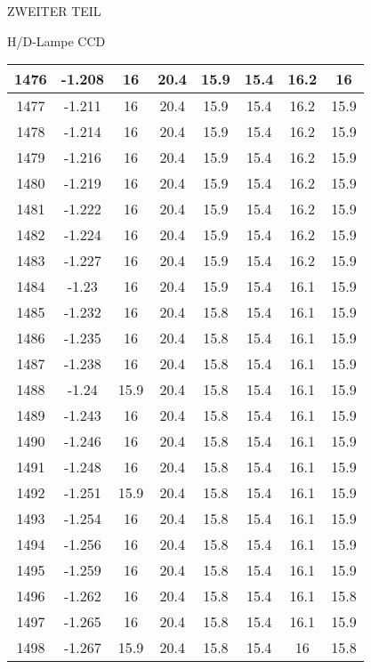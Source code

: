 \begin{appendix}
\begin{chapter}{ZWEITER TEIL}
\begin{section}{H/D-Lampe CCD}
\begin{scriptsize}
\begin{longtable}[htbp]{|c|c|c|c|c|c|c|c|}
            1476 & -1.208 & 16 & 20.4 & 15.9 & 15.4 & 16.2 & 16 \\ \hline
            1477 & -1.211 & 16 & 20.4 & 15.9 & 15.4 & 16.2 & 15.9 \\ \hline
            1478 & -1.214 & 16 & 20.4 & 15.9 & 15.4 & 16.2 & 15.9 \\ \hline
            1479 & -1.216 & 16 & 20.4 & 15.9 & 15.4 & 16.2 & 15.9 \\ \hline
            1480 & -1.219 & 16 & 20.4 & 15.9 & 15.4 & 16.2 & 15.9 \\ \hline
            1481 & -1.222 & 16 & 20.4 & 15.9 & 15.4 & 16.2 & 15.9 \\ \hline
            1482 & -1.224 & 16 & 20.4 & 15.9 & 15.4 & 16.2 & 15.9 \\ \hline
            1483 & -1.227 & 16 & 20.4 & 15.9 & 15.4 & 16.2 & 15.9 \\ \hline
            1484 & -1.23 & 16 & 20.4 & 15.9 & 15.4 & 16.1 & 15.9 \\ \hline
            1485 & -1.232 & 16 & 20.4 & 15.8 & 15.4 & 16.1 & 15.9 \\ \hline
            1486 & -1.235 & 16 & 20.4 & 15.8 & 15.4 & 16.1 & 15.9 \\ \hline
            1487 & -1.238 & 16 & 20.4 & 15.8 & 15.4 & 16.1 & 15.9 \\ \hline
            1488 & -1.24 & 15.9 & 20.4 & 15.8 & 15.4 & 16.1 & 15.9 \\ \hline
            1489 & -1.243 & 16 & 20.4 & 15.8 & 15.4 & 16.1 & 15.9 \\ \hline
            1490 & -1.246 & 16 & 20.4 & 15.8 & 15.4 & 16.1 & 15.9 \\ \hline
            1491 & -1.248 & 16 & 20.4 & 15.8 & 15.4 & 16.1 & 15.9 \\ \hline
            1492 & -1.251 & 15.9 & 20.4 & 15.8 & 15.4 & 16.1 & 15.9 \\ \hline
            1493 & -1.254 & 16 & 20.4 & 15.8 & 15.4 & 16.1 & 15.9 \\ \hline
            1494 & -1.256 & 16 & 20.4 & 15.8 & 15.4 & 16.1 & 15.9 \\ \hline
            1495 & -1.259 & 16 & 20.4 & 15.8 & 15.4 & 16.1 & 15.9 \\ \hline
            1496 & -1.262 & 16 & 20.4 & 15.8 & 15.4 & 16.1 & 15.8 \\ \hline
            1497 & -1.265 & 16 & 20.4 & 15.8 & 15.4 & 16.1 & 15.9 \\ \hline
            1498 & -1.267 & 15.9 & 20.4 & 15.8 & 15.4 & 16 & 15.8 \\ \hline

\end{longtable}
\end{scriptsize}
\end{section}
\end{chapter}
\end{appendix}
